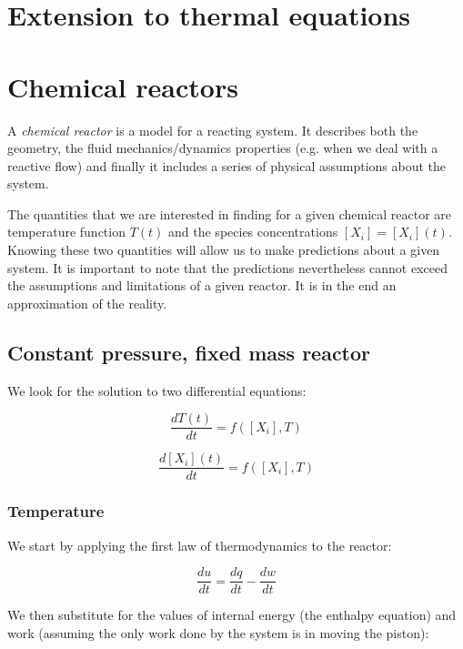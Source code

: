 \documentclass[10pt,twocolumn]{article}
\begin{document}
\section{Extension to thermal equations}




\section{Chemical reactors}

A \textit{chemical reactor} is a model for a reacting system. It describes both the geometry, the fluid mechanics/dynamics properties (e.g. when we deal with a reactive flow) and finally it includes a series of physical assumptions about the system.

The quantities that we are interested in finding for a given chemical reactor are temperature function $T(t)$ and the species concentrations $[X_i] = [X_i](t)$. Knowing these two quantities will allow us to make predictions about a given system. It is important to note that the predictions nevertheless cannot exceed the assumptions and limitations of a given reactor. It is in the end an approximation of the reality.

\subsection{Constant pressure, fixed mass reactor}

We look for the solution to two differential equations:

\begin{equation}
\frac{d T(t)}{dt} = f([X_i], T)
\end{equation}

\begin{equation}
\frac{d [X_i](t)}{dt} = f([X_i], T)
\end{equation}

\subsubsection{Temperature}

We start by applying the first law of thermodynamics to the reactor:

\begin{equation}
\frac{du}{dt} = \frac{dq}{dt} - \frac{dw}{dt}
\end{equation}

We then substitute for the values of internal energy (the enthalpy equation) and work (assuming the only work done by the system is in moving the piston):
\end{document}
